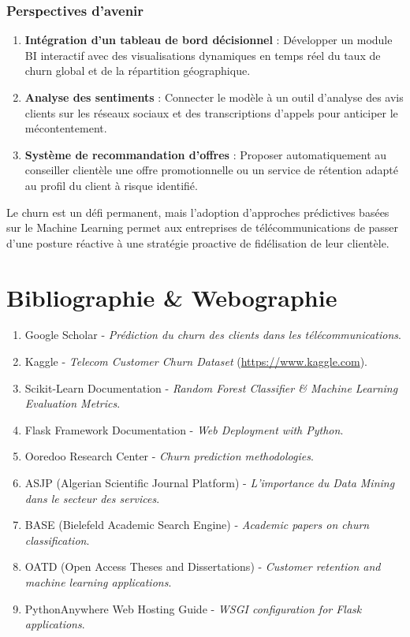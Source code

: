 \documentclass[a4paper,12pt]{report}
\begin{document}
\subsection*{Perspectives d'avenir}
\begin{enumerate}
    \item \textbf{Intégration d'un tableau de bord décisionnel} : Développer un module BI interactif avec des visualisations dynamiques en temps réel du taux de churn global et de la répartition géographique.
    \item \textbf{Analyse des sentiments} : Connecter le modèle à un outil d'analyse des avis clients sur les réseaux sociaux et des transcriptions d'appels pour anticiper le mécontentement.
    \item \textbf{Système de recommandation d'offres} : Proposer automatiquement au conseiller clientèle une offre promotionnelle ou un service de rétention adapté au profil du client à risque identifié.
\end{enumerate}

Le churn est un défi permanent, mais l'adoption d'approches prédictives basées sur le Machine Learning permet aux entreprises de télécommunications de passer d'une posture réactive à une stratégie proactive de fidélisation de leur clientèle.

\chapter*{Bibliographie \& Webographie}
\begin{enumerate}
    \item Google Scholar - \emph{Prédiction du churn des clients dans les télécommunications}.
    \item Kaggle - \emph{Telecom Customer Churn Dataset} (\url{https://www.kaggle.com}).
    \item Scikit-Learn Documentation - \emph{Random Forest Classifier \& Machine Learning Evaluation Metrics}.
    \item Flask Framework Documentation - \emph{Web Deployment with Python}.
    \item Ooredoo Research Center - \emph{Churn prediction methodologies}.
    \item ASJP (Algerian Scientific Journal Platform) - \emph{L'importance du Data Mining dans le secteur des services}.
    \item BASE (Bielefeld Academic Search Engine) - \emph{Academic papers on churn classification}.
    \item OATD (Open Access Theses and Dissertations) - \emph{Customer retention and machine learning applications}.
    \item PythonAnywhere Web Hosting Guide - \emph{WSGI configuration for Flask applications}.
\end{enumerate}
\end{document}

